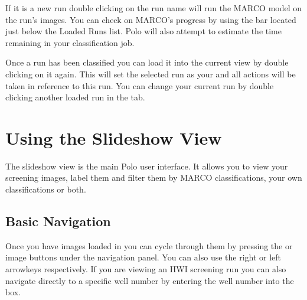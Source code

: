 \documentclass[letterpaper,10pt,english]{sphinxmanual}
\begin{document}
If it is a new run double clicking on the run name will run the MARCO model
on the run’s images. You can check on MARCO’s progress by using the
 bar located just below the Loaded Runs list. Polo
will also attempt to estimate the time remaining in your classification job.
\begin{quote}

\noindent{}
\end{quote}

Once a run has been classified you can load it into the current view
by double clicking on it again. This will set the selected run as your
 and all actions will be taken in reference to this run.
You can change your current run by double clicking another loaded run in the
 tab.
\begin{quote}

\noindent{}
\end{quote}


\section{Using the Slideshow View}
\label{\detokenize{user_guide:using-the-slideshow-view}}
The slideshow view is the main Polo user interface. It allows you to view
your screening images, label them and filter them by MARCO classifications,
your own classifications or both.
\begin{quote}

\noindent{}
\end{quote}


\subsection{Basic Navigation}
\label{\detokenize{user_guide:basic-navigation}}
Once you have images loaded in you can cycle through them by
pressing the  or  image buttons under the navigation
panel. You can also use the right or left arrowkeys respectively. If you are
viewing an HWI screening run you can also navigate directly to a specific
well number by entering the well number into the  box.
\end{document}
